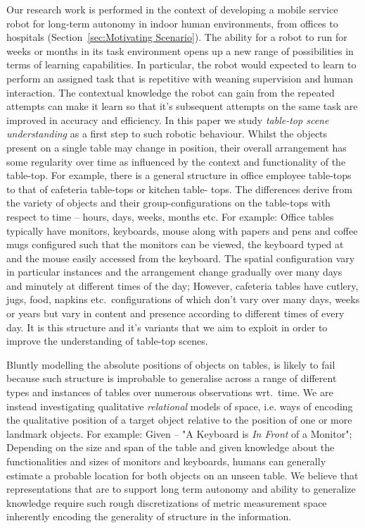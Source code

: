 \documentclass[letterpaper, 10 pt, conference]{ieeeconf}  %
\begin{document}
Our research work is performed in the context of developing a mobile service robot for long-term autonomy in indoor human environments, from 
offices to hospitals (Section~\ref{sec:Motivating Scenario}). 
The ability for a robot to run for weeks or months in its task environment opens up a new range of possibilities in terms of learning 
capabilities. In particular, the robot would expected to learn to perform an assigned task that is repetitive with weaning supervision and 
human interaction. The contextual knowledge the robot can gain from the repeated attempts can make it learn so that it's subsequent attempts 
on the same task are improved in accuracy and efficiency. 
In this paper we study \emph{table-top scene understanding} as a first step to such robotic behaviour. Whilst the objects present on a 
single table may change in position, their overall arrangement has some regularity over time as influenced by the context and functionality 
of the table-top. For example, there is a general structure in office employee table-tops to that of cafeteria table-tops or kitchen table-
tops. The differences derive from the variety of objects and their group-configurations on the table-tops with respect to time -- hours, 
days, weeks, months etc. For example: Office tables typically have monitors, keyboards, mouse along with papers and pens and coffee mugs 
configured such that the monitors can be viewed, the keyboard typed at and the mouse easily accessed from the keyboard. The spatial 
configuration vary in particular instances and the arrangement change gradually over many days and minutely at different times of the day; 
However, cafeteria tables have cutlery, jugs, food, napkins etc.\ configurations of which don't vary over many days, weeks or years but vary 
in content and presence according to different times of every day. It is this structure and it's variants that we aim to exploit in order to 
improve the understanding of table-top scenes.

Bluntly modelling the absolute positions of objects on tables, is likely to fail because such structure is improbable to 
generalise across a range of different types and instances of tables over numerous observations wrt.\ time. We are instead 
investigating qualitative \emph{relational} models of space, i.e. ways of encoding the qualitative position of a target object relative to 
the position of one or more landmark objects. For example: Given -- "A Keyboard is \textit{In Front} of a Monitor"; Depending on the size 
and span of the table and given knowledge about the functionalities and sizes of monitors and keyboards, humans can generally estimate a 
probable location for both objects on an unseen table. We believe that representations that are to support long term autonomy and ability to 
generalize knowledge require such rough discretizations of metric measurement space inherently encoding the generality of structure in the 
information. 
\end{document}
